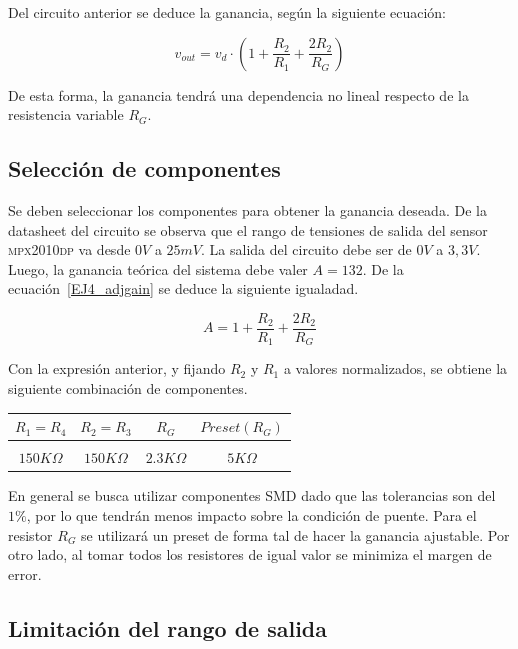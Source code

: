 Del circuito anterior se deduce la ganancia, seg\'un la siguiente ecuaci\'on:

\begin{equation}
v_{out} = v_d \cdot \left( 1+\frac{R_2}{R_1}+\frac{2R_2}{R_G} \right)
\label{EJ4_adjgain}
\end{equation}

De esta forma, la ganancia tendr\'a una dependencia no lineal respecto de la resistencia variable $R_G$.

\subsection{Selecci\'on de componentes}

Se deben seleccionar los componentes para obtener la ganancia deseada. De la datasheet del circuito se observa que el rango de tensiones de salida del sensor \textsc{mpx2010dp} va desde $0V$ a $25mV$. La salida del circuito debe ser de $0V$ a $3,3V$. Luego, la ganancia te\'orica del sistema debe valer $A = 132$. De la ecuaci\'on~\ref{EJ4_adjgain} se deduce la siguiente igualadad.


\begin{equation}
A = 1+\frac{R_2}{R_1}+\frac{2R_2}{R_G}
\end{equation}

Con la expresi\'on anterior, y fijando $R_2$ y $R_1$ a valores normalizados, se obtiene la siguiente combinaci\'on de componentes.

\begin{table}[H]
    \centering
    \begin{tabular}{c c c c}
        $R_1 = R_4$ & $R_2 = R_3$ & $R_G$ & $Preset (R_G)$  \\
        \hline \\
        $150 K\Omega$ & $150 K\Omega$ & $2.3 K\Omega$ & $5 K\Omega$ \\
        \hline
    \end{tabular}
\end{table}

En general se busca utilizar componentes SMD dado que las tolerancias son del $1\%$, por lo que tendr\'an menos impacto sobre la condici\'on de puente. Para el resistor $R_G$ se utilizar\'a un preset de forma tal de hacer la ganancia ajustable. Por otro lado, al tomar todos los resistores de igual valor se minimiza el margen de error.

\subsection{Limitaci\'on del rango de salida}

